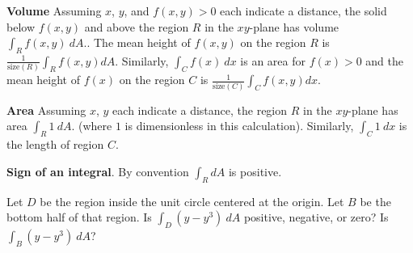 \documentclass[12pt,letterpaper,noanswers]{exam}
\begin{document}




\noindent\textbf{Volume} Assuming $x$, $y$, and $f(x,y)>0$ each indicate a distance, the solid below $f(x,y)$ and above the region $R$ in the $xy$-plane has volume $\displaystyle\int_R f(x,y)\ dA.$. The mean height of $f(x,y)$ on the region $R$ is $\frac{1}{\text{size}(R)}\int_R f(x,y)dA$. Similarly, $\displaystyle\int_C f(x)\ dx$ is an area for $f(x)>0$ and the mean height of $f(x)$ on the region $C$ is $\frac{1}{\text{size}(C)}\int_C f(x,y)dx$.
\vfill


\noindent\textbf{Area} Assuming $x$, $y$ each indicate a distance, the region $R$ in the $xy$-plane has area $\displaystyle\int_R 1\ dA.$ (where $1$ is dimensionless in this calculation).  Similarly, $\displaystyle\int_C 1\ dx$ is the length of region $C$.
\vfill


\noindent\textbf{Sign of an integral}.  By convention $\int_R dA$ is positive.  

Let $D$ be the region inside the unit circle centered at the origin.  Let $B$ be the bottom half of that region. Is $\int_D (y-y^3)\ dA$ positive, negative, or zero?  
Is $\int_B (y-y^3)\ dA$?
\vspace{1in}
\end{document}
